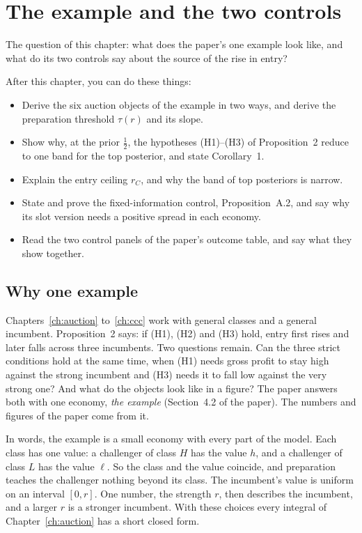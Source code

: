 \chapter{The example and the two controls}\label{ch:example}

\begin{chapterplan}
The question of this chapter: what does the paper's one example look like, and what do its two controls say about
the source of the rise in entry?

After this chapter, you can do these things:
\begin{itemize}
\item Derive the six auction objects of the example in two ways, and derive the preparation threshold
  \(\tau(r)\) and its slope.
\item Show why, at the prior \(\tfrac12\), the hypotheses (H1)--(H3) of Proposition~2 reduce to one band for the
  top posterior, and state Corollary~1.
\item Explain the entry ceiling \(r_C\), and why the band of top posteriors is narrow.
\item State and prove the fixed-information control, Proposition~A.2, and say why its slot version needs a
  positive spread in each economy.
\item Read the two control panels of the paper's outcome table, and say what they show together.
\end{itemize}
\end{chapterplan}

\section{Why one example}\label{sec:example-why}

Chapters~\ref{ch:auction} to~\ref{ch:ccc} work with general classes and a general incumbent. Proposition~2 says: if
(H1), (H2) and (H3) hold, entry first rises and later falls across three incumbents. Two questions remain. Can the
three strict conditions hold at the same time, when (H1) needs gross profit to stay high against the strong
incumbent and (H3) needs it to fall low against the very strong one? And what do the objects look like in a
figure? The paper answers both with one economy, \emph{the example} (Section~4.2 of the paper). The numbers and
figures of the paper come from it.

In words, the example is a small economy with every part of the model. Each class has one value: a challenger of
class \(H\) has the value \(h\), and a challenger of class \(L\) has the value \(\ell\). So the class
and the value coincide, and preparation teaches the challenger nothing beyond its class. The incumbent's value is
uniform on an interval \([0,r]\). One number, the strength \(r\), then describes the incumbent, and a larger \(r\)
is a stronger incumbent. With these choices every integral of Chapter~\ref{ch:auction} has a short closed form.


